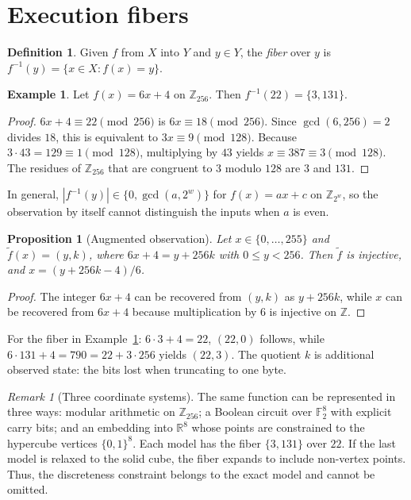 \documentclass[11pt]{article}
\newtheorem{proposition}[theorem]{Proposition}
\theoremstyle{definition}
\newtheorem{definition}[theorem]{Definition}
\newtheorem{example}[theorem]{Example}
\theoremstyle{remark}
\newtheorem{remark}[theorem]{Remark}
\newcommand{\Z}{\mathbb{Z}}
\newcommand{\F}{\mathbb{F}}
\begin{document}
\section{Execution fibers}\label{sec:exec}

\begin{definition}
Given $f$ from $X$ into $Y$ and $y \in Y$, the \emph{fiber} over $y$ is $f^{-1}(y) = \{x \in X : f(x) = y\}$.
\end{definition}

\begin{example}\label{ex:fiber}
Let $f(x) = 6x + 4$ on $\Z_{256}$. Then $f^{-1}(22) = \{3, 131\}$.
\end{example}

\begin{proof}
$6x + 4 \equiv 22 \pmod{256}$ is $6x \equiv 18 \pmod{256}$. Since $\gcd(6,256) = 2$ divides $18$, this is equivalent to $3x \equiv 9 \pmod{128}$. Because $3 \cdot 43 = 129 \equiv 1 \pmod{128}$, multiplying by $43$ yields $x \equiv 387 \equiv 3 \pmod{128}$. The residues of $\Z_{256}$ that are congruent to $3$ modulo $128$ are $3$ and $131$.
\end{proof}

In general, $|f^{-1}(y)| \in \{0, \gcd(a, 2^w)\}$ for $f(x) = ax + c$ on $\Z_{2^w}$, so the observation by itself cannot distinguish the inputs when $a$ is even.

\begin{proposition}[Augmented observation]
Let $x \in \{0, \dots, 255\}$ and $\tilde f(x) = (y, k)$, where $6x + 4 = y + 256k$ with $0 \le y < 256$. Then $\tilde f$ is injective, and $x = (y + 256k - 4)/6$.
\end{proposition}

\begin{proof}
The integer $6x + 4$ can be recovered from $(y,k)$ as $y + 256k$, while $x$ can be recovered from $6x + 4$ because multiplication by $6$ is injective on $\Z$.
\end{proof}

For the fiber in Example~\ref{ex:fiber}: $6 \cdot 3 + 4 = 22$, $(22, 0)$ follows, while $6 \cdot 131 + 4 = 790 = 22 + 3 \cdot 256$ yields $(22, 3)$. The quotient $k$ is additional observed state: the bits lost when truncating to one byte.

\begin{remark}[Three coordinate systems]
The same function can be represented in three ways: modular arithmetic on $\Z_{256}$; a Boolean circuit over $\F_2^8$ with explicit carry bits; and an embedding into $\mathbb{R}^8$ whose points are constrained to the hypercube vertices $\{0,1\}^8$. Each model has the fiber $\{3,131\}$ over $22$. If the last model is relaxed to the solid cube, the fiber expands to include non-vertex points. Thus, the discreteness constraint belongs to the exact model and cannot be omitted.
\end{remark}
\end{document}
